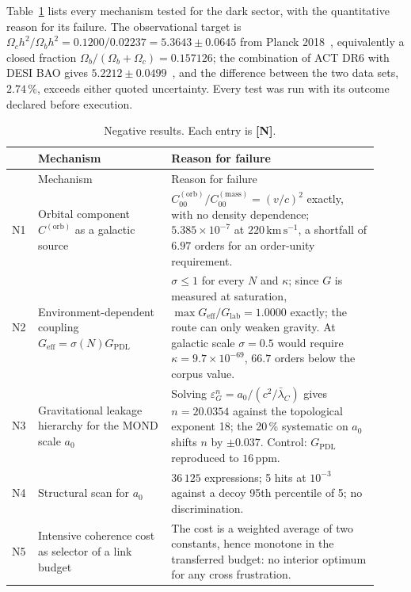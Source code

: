 \documentclass[11pt,a4paper]{article}
\theoremstyle{plain}
\theoremstyle{definition}
\theoremstyle{remark}
\newcommand{\statN}{\textbf{[N]}}
\begin{document}
Table~\ref{tab:negative} lists every mechanism tested for the dark sector, with the quantitative reason for its failure. The observational target is $\Omega_c h^2/\Omega_b h^2=0.1200/0.02237=5.3643\pm0.0645$ from Planck 2018~\citep{Planck2018}, equivalently a closed fraction $\Omega_b/(\Omega_b+\Omega_c)=0.157126$; the combination of ACT DR6 with DESI BAO gives $5.2212\pm0.0499$~\citep{ACTDR6}, and the difference between the two data sets, $2.74\,\%$, exceeds either quoted uncertainty. Every test was run with its outcome declared before execution.

\begin{small}
\begin{longtable}{>{\raggedright\arraybackslash}p{0.05\linewidth}>{\raggedright\arraybackslash}p{0.34\linewidth}>{\raggedright\arraybackslash}p{0.53\linewidth}}
\caption{Negative results. Each entry is \statN.}\label{tab:negative}\\
\toprule
& Mechanism & Reason for failure \\
\midrule
\endfirsthead
\toprule
& Mechanism & Reason for failure \\
\midrule
\endhead
N1 & Orbital component $C^{(\mathrm{orb})}$ as a galactic source & $C^{(\mathrm{orb})}_{00}/C^{(\mathrm{mass})}_{00}=(v/c)^2$ exactly, with no density dependence; $5.385\times10^{-7}$ at $220\,\mathrm{km\,s^{-1}}$, a shortfall of $6.97$ orders for an order-unity requirement. \\
N2 & Environment-dependent coupling $G_{\mathrm{eff}}=\sigma(N)G_{\mathrm{PDL}}$ & $\sigma\le1$ for every $N$ and $\kappa$; since $G$ is measured at saturation, $\max G_{\mathrm{eff}}/G_{\mathrm{lab}}=1.0000$ exactly; the route can only weaken gravity. At galactic scale $\sigma=0.5$ would require $\kappa=9.7\times10^{-69}$, $66.7$ orders below the corpus value. \\
N3 & Gravitational leakage hierarchy for the MOND scale $a_0$ & Solving $\varepsilon_G^n=a_0/(c^2/\bar\lambda_C)$ gives $n=20.0354$ against the topological exponent 18; the 20\,\% systematic on $a_0$ shifts $n$ by $\pm0.037$. Control: $G_{\mathrm{PDL}}$ reproduced to $16\,\mathrm{ppm}$. \\
N4 & Structural scan for $a_0$ & $36\,125$ expressions; 5 hits at $10^{-3}$ against a decoy 95th percentile of 5; no discrimination. \\
N5 & Intensive coherence cost as selector of a link budget & The cost is a weighted average of two constants, hence monotone in the transferred budget: no interior optimum for any cross frustration. \\

\end{longtable}
\end{small}
\end{document}
